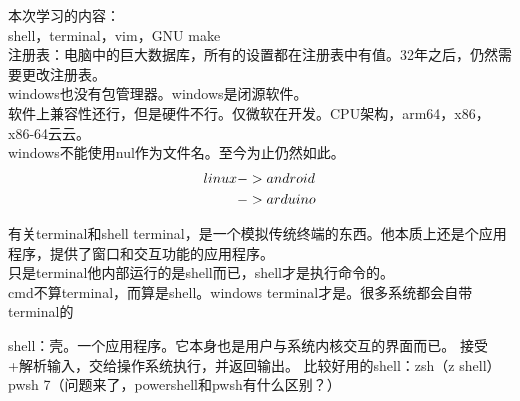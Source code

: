 \documentclass{article}
\begin{document}
\noindent
本次学习的内容：\\
shell，terminal，vim，GNU make\\

\noindent
注册表：电脑中的巨大数据库，所有的设置都在注册表中有值。32年之后，仍然需要更改注册表。\\
windows也没有包管理器。windows是闭源软件。\\
软件上兼容性还行，但是硬件不行。仅微软在开发。CPU架构，arm64，x86，x86-64云云。\\
windows不能使用nul作为文件名。至今为止仍然如此。\\
\begin{align}
    linux & ->android \notag   \\
          & ->arduino   \notag
\end{align}

\noindent
有关terminal和shell
terminal，是一个模拟传统终端的东西。他本质上还是个应用程序，提供了窗口和交互功能的应用程序。\\
只是terminal他内部运行的是shell而已，shell才是执行命令的。\\
cmd不算terminal，而算是shell。windows terminal才是。很多系统都会自带terminal的

\noindent
shell：壳。一个应用程序。它本身也是用户与系统内核交互的界面而已。
接受+解析输入，交给操作系统执行，并返回输出。
比较好用的shell：zsh（z shell）
pwsh 7（问题来了，powershell和pwsh有什么区别？）
\end{document}

